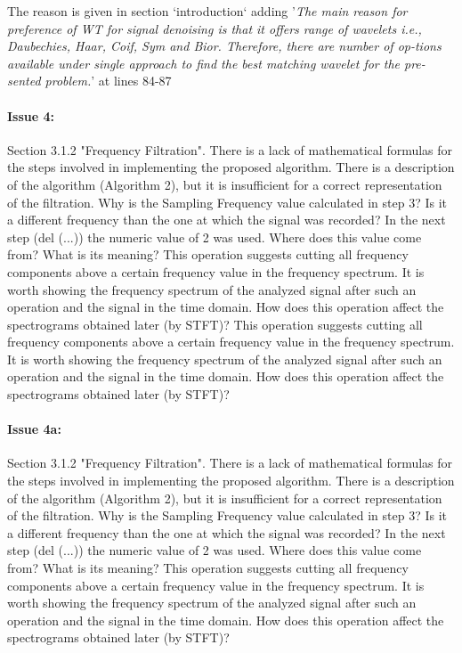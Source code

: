 \documentclass{article}
\begin{document}
The reason is given in section `introduction` adding '\textit{The main reason for preference of WT for signal denoising is that it offers range of wavelets i.e., Daubechies, Haar, Coif, Sym and Bior. Therefore, there are number of op-tions available under single approach to find the best matching wavelet for the pre-sented problem.}' at lines 84-87

\paragraph{Issue 4:}
\begin{displayquote}
Section 3.1.2 "Frequency Filtration". There is a lack of mathematical formulas for the steps involved in implementing the proposed algorithm. There is a description of the algorithm (Algorithm 2), but it is insufficient for a correct representation of the filtration. Why is the Sampling Frequency  value calculated in step 3? Is it a different frequency than the one at which the signal was recorded? In the next step (del (...)) the numeric value of 2 was used. Where does this value come from? What is its meaning? This operation suggests cutting all frequency components above a certain frequency value in the frequency spectrum. It is worth showing the frequency spectrum of the analyzed signal after such an operation and the signal in the time domain. How does this operation affect the spectrograms obtained later (by STFT)? This operation suggests cutting all frequency components above a certain frequency value in the frequency spectrum. It is worth showing the frequency spectrum of the analyzed signal after such an operation and the signal in the time domain. How does this operation affect the spectrograms obtained later (by STFT)?
\end{displayquote}

\paragraph{Issue 4a:}
\begin{displayquote}
Section 3.1.2 "Frequency Filtration". There is a lack of mathematical formulas for the steps involved in implementing the proposed algorithm. There is a description of the algorithm (Algorithm 2), but it is insufficient for a correct representation of the filtration. Why is the Sampling Frequency  value calculated in step 3? Is it a different frequency than the one at which the signal was recorded? In the next step (del (...)) the numeric value of 2 was used. Where does this value come from? What is its meaning? This operation suggests cutting all frequency components above a certain frequency value in the frequency spectrum. It is worth showing the frequency spectrum of the analyzed signal after such an operation and the signal in the time domain. How does this operation affect the spectrograms obtained later (by STFT)?
\end{displayquote}
\end{document}
